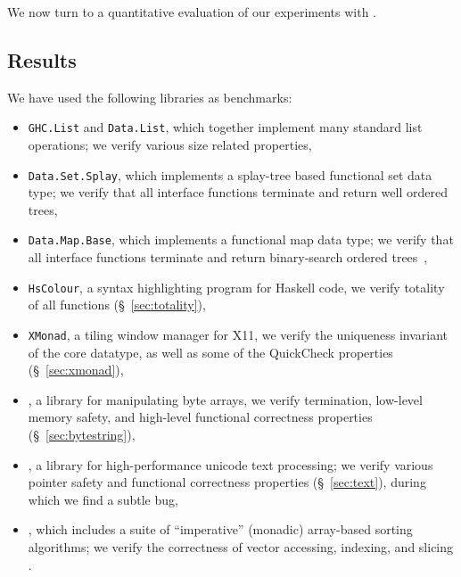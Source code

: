 We now turn to a quantitative evaluation of our experiments with \toolname.



\subsection{Results}

We have used the following libraries as benchmarks:
%
\begin{itemize}
\item \texttt{GHC.List} and \texttt{Data.List}, which together implement many standard
      list operations; we verify various
      size related properties,
\item \texttt{Data.Set.Splay}, which implements a splay-tree
      based functional set data type; we verify that all interface 
      functions terminate and return well ordered trees,
\item \texttt{Data.Map.Base}, which implements a functional 
      map data type; we verify that all interface functions 
      terminate and return binary-search ordered trees~\cite{vazou13}, 
\item \texttt{HsColour}, a syntax highlighting program for Haskell code, we
      verify totality of all functions (\S~\ref{sec:totality}),
\item \texttt{XMonad}, a tiling window manager for X11, we verify the uniqueness
      invariant of the core datatype, as well as some of the QuickCheck
      properties (\S~\ref{sec:xmonad}),
\item \bytestring, a library for manipulating byte arrays, we
      verify termination, low-level memory safety, and high-level
      functional correctness properties (\S~\ref{sec:bytestring}),
\item \libtext, a library for high-performance unicode text 
      processing; we verify various pointer safety and 
      functional correctness properties (\S~\ref{sec:text}),
      during which we find a subtle bug,
\item \libvectoralgos, which includes a suite of 
      ``imperative'' (\ie monadic) array-based sorting algorithms; 
      we verify the correctness of vector accessing, indexing, and slicing \etc.
\end{itemize}

